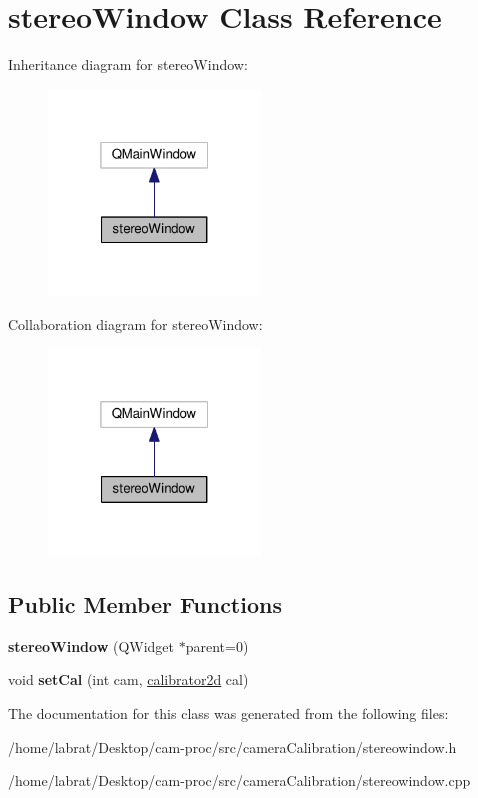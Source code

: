 \hypertarget{classstereoWindow}{}\section{stereo\+Window Class Reference}
\label{classstereoWindow}


Inheritance diagram for stereo\+Window\+:\nopagebreak
\begin{figure}[H]
\begin{center}
\leavevmode
\includegraphics[width=160pt]{classstereoWindow__inherit__graph}
\end{center}
\end{figure}


Collaboration diagram for stereo\+Window\+:\nopagebreak
\begin{figure}[H]
\begin{center}
\leavevmode
\includegraphics[width=160pt]{classstereoWindow__coll__graph}
\end{center}
\end{figure}
\subsection*{Public Member Functions}
\begin{DoxyCompactItemize}
\item 
{\bfseries stereo\+Window} (Q\+Widget $\ast$parent=0)\hypertarget{classstereoWindow_a60353cf085a074c15042eff044e3d918}{}\label{classstereoWindow_a60353cf085a074c15042eff044e3d918}

\item 
void {\bfseries set\+Cal} (int cam, \hyperlink{classcalibrator2d}{calibrator2d} cal)\hypertarget{classstereoWindow_ab753e19200ebe871c2ceac6f8b6e3cee}{}\label{classstereoWindow_ab753e19200ebe871c2ceac6f8b6e3cee}

\end{DoxyCompactItemize}


The documentation for this class was generated from the following files\+:\begin{DoxyCompactItemize}
\item 
/home/labrat/\+Desktop/cam-\/proc/src/camera\+Calibration/stereowindow.\+h\item 
/home/labrat/\+Desktop/cam-\/proc/src/camera\+Calibration/stereowindow.\+cpp\end{DoxyCompactItemize}
